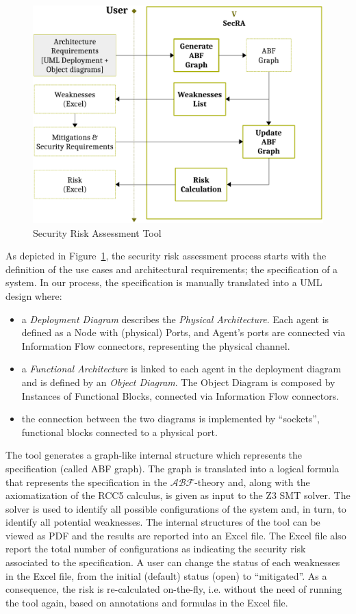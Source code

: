 \documentclass[conference]{IEEEtran}
\newcommand{\assertionRegion}{\mathcal{A}}
\newcommand{\beliefRegion}{\mathcal{B}}
\newcommand{\factRegion}{\mathcal{F}}
\newcommand{\abftheory}{\assertionRegion\beliefRegion\factRegion}
\begin{document}
\begin{figure}
	\centering
	\includegraphics[width=\columnwidth]{v-secra.pdf}
	\caption{Security Risk Assessment Tool}
	\label{fig:secra}
\end{figure}
As depicted in Figure~\ref{fig:secra}, the security risk assessment process
starts with the definition of the use cases and architectural requirements; the
specification of a system.  In our process, the specification is manually
translated into a UML design where:
\begin{itemize}
	\item a \emph{Deployment Diagram} describes the \emph{Physical
		Architecture}. Each agent is defined as a Node with (physical)
		Ports, and Agent's ports are connected via Information Flow
		connectors, representing the physical channel.
	\item a \emph{Functional Architecture} is linked to each agent in the
		deployment diagram and is defined by an \emph{Object Diagram}.
		The Object Diagram is composed by Instances of Functional
		Blocks, connected via Information Flow connectors.
	\item the connection between the two diagrams is implemented by
		``sockets'', functional blocks connected to a 
		physical port.
\end{itemize}

The tool generates a graph-like internal structure which represents
the specification (called ABF graph). The graph is translated into 
a logical formula that represents the specification in the $\abftheory$-theory and,
along with the axiomatization of the RCC5 calculus, is given as input to the Z3 SMT solver.
The solver is used to identify all possible configurations of the system and, in turn,
to identify all potential weaknesses. 
The internal structures of the tool
can be viewed as PDF and the results are reported into an Excel file.
The Excel file also report the total number of configurations as indicating
the security risk associated to the specification. A user can change the status
of each weaknesses in the Excel file, from the initial (default) status (open)
to ``mitigated''. As a consequence, the risk is re-calculated on-the-fly, i.e.
without the need of running the tool again, based on annotations and formulas 
in the Excel file.
\end{document}
